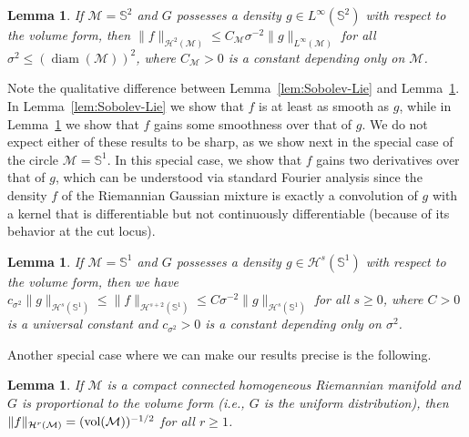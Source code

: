 \documentclass[preprint]{imsart}
\theoremstyle{plain}
\newtheorem{lemma}[theorem]{Lemma}
\theoremstyle{definition}
\newcommand{\Mcal}{\mathcal{M}}
\newcommand{\Hcal}{\mathcal{H}}
\newcommand{\vol}{\textnormal{vol}}
\DeclareMathOperator{\diam}{diam}
\begin{document}
\begin{lemma}\label{lem:sphere-estimate}
    If $\Mcal=\mathbb{S}^2$ and $G$ possesses a density $g\in L^\infty(\mathbb S^2)$ with respect to the volume form, then $\|f\|_{\Hcal^2(\Mcal)}\le C_{\Mcal} \sigma^{-2}\|g\|_{L^{\infty}(\Mcal)}$ for all $\sigma^2\le (\diam(\Mcal))^2$, where $C_\Mcal>0$ is a constant depending only on $\Mcal$. 
\end{lemma}

Note the qualitative difference between Lemma~\ref{lem:Sobolev-Lie} and Lemma~\ref{lem:sphere-estimate}.
In Lemma~\ref{lem:Sobolev-Lie} we show that $f$ is at least as smooth as $g$, while in Lemma~\ref{lem:sphere-estimate} we show that $f$ gains some smoothness over that of $g$.
We do not expect either of these results to be sharp, as we show next in the special case of the circle $\Mcal=\mathbb{S}^1$.
In this special case, we show that $f$ gains two derivatives over that of $g$, which can be understood via standard Fourier analysis since the density $f$ of the Riemannian Gaussian mixture is exactly a convolution of $g$ with a kernel that is differentiable but not continuously differentiable (because of its behavior at the cut locus).

\begin{lemma}\label{lem:Sobolev-bd-S1}
    If $\Mcal=\mathbb{S}^1$ and $G$ possesses a density $g\in\Hcal^s(\mathbb{S}^1)$ with respect to the volume form, then we have $c_{\sigma^2}\|g\|_{\Hcal^{s}(\mathbb{S}^1)}\le \|f\|_{\Hcal^{s+2}(\mathbb{S}^1)}\le C \sigma^{-2}\|g\|_{\Hcal^{s}(\mathbb{S}^1)}$ for all $s\ge 0$, where $C>0$ is a universal constant and $c_{\sigma^2}>0$ is a constant depending only on $\sigma^2$.
\end{lemma}

Another special case where we can make our results precise is the following.

\begin{lemma}\label{lem:ex-uniform}
    If $\Mcal$ is a compact connected homogeneous Riemannian manifold and $G$ is proportional to the volume form (i.e., $G$ is the uniform distribution), then $\|f\|_{\Hcal^r(\Mcal)}=(\vol(\Mcal))^{-1/2}$ for all $r\ge 1$.
\end{lemma}
\end{document}
